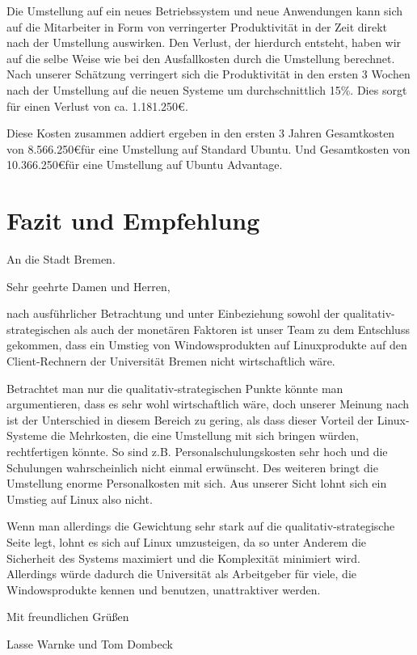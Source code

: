 \documentclass[12pt,utf8]{scrartcl}
\begin{document}
Die Umstellung auf ein neues Betriebssystem und neue Anwendungen kann sich auf die Mitarbeiter in Form von verringerter Produktivität in der Zeit direkt nach der Umstellung auswirken. Den Verlust, der hierdurch entsteht, haben wir auf die selbe Weise wie bei den Ausfallkosten durch die Umstellung berechnet. Nach unserer Schätzung verringert sich die Produktivität in den ersten 3 Wochen nach der Umstellung auf die neuen Systeme um durchschnittlich 15\%. Dies sorgt für einen Verlust von ca. 1.181.250\euro .
\newline

Diese Kosten zusammen addiert ergeben in den ersten 3 Jahren Gesamtkosten von 8.566.250\euro \space für eine Umstellung auf Standard Ubuntu. Und Gesamtkosten von 10.366.250\euro \space für eine Umstellung auf Ubuntu Advantage.

\newpage
\section*{Fazit und Empfehlung}

An die Stadt Bremen.
\newline

Sehr geehrte Damen und Herren,
\newline

nach ausführlicher Betrachtung und unter Einbeziehung sowohl der qualitativ-strategischen als auch der monetären Faktoren ist unser Team zu dem Entschluss gekommen, dass ein Umstieg von Windowsprodukten auf Linuxprodukte auf den Client-Rechnern der Universität Bremen nicht wirtschaftlich wäre. 

Betrachtet man nur die qualitativ-strategischen Punkte könnte man argumentieren, dass es sehr wohl wirtschaftlich wäre, doch unserer Meinung nach ist der Unterschied in diesem Bereich zu gering, als dass dieser Vorteil der Linux-Systeme die Mehrkosten, die eine Umstellung mit sich bringen würden, rechtfertigen könnte. So sind z.B. Personalschulungskosten sehr hoch und die Schulungen wahrscheinlich nicht einmal erwünscht. Des weiteren bringt die Umstellung enorme Personalkosten mit sich. Aus unserer Sicht lohnt sich ein Umstieg auf Linux also nicht. 

Wenn man allerdings die Gewichtung sehr stark auf die qualitativ-strategische Seite legt, lohnt es sich auf Linux umzusteigen, da so unter Anderem die Sicherheit des Systems maximiert und die Komplexität minimiert wird. Allerdings würde dadurch die Universität als Arbeitgeber für viele, die Windowsprodukte kennen und benutzen, unattraktiver werden. 
\newline

Mit freundlichen Grüßen
\newline

Lasse Warnke und Tom Dombeck


\newpage
\begin{flushleft}

\end{flushleft}
\end{document}
